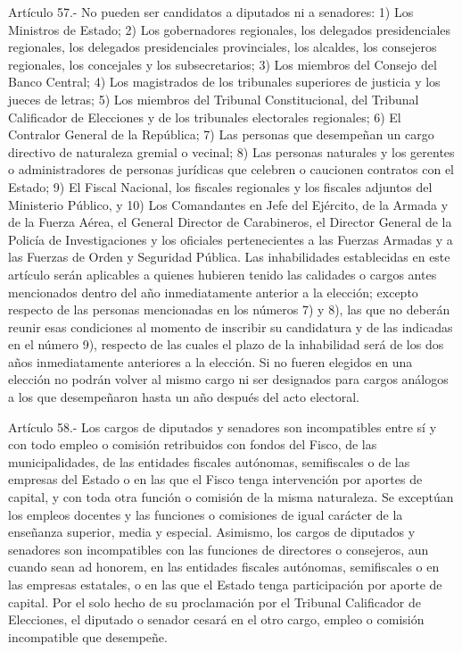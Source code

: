     Artículo 57.- No pueden ser candidatos a diputados ni a senadores:
    1) Los Ministros de Estado;
    2) Los gobernadores regionales, los delegados presidenciales regionales, los delegados presidenciales provinciales, los alcaldes, los consejeros regionales, los concejales y los subsecretarios;
    3) Los miembros del Consejo del Banco Central;
    4) Los magistrados de los tribunales superiores de justicia y los jueces de letras;
    5) Los miembros del Tribunal Constitucional, del Tribunal Calificador de Elecciones y de los tribunales electorales regionales;
    6) El Contralor General de la República;
    7) Las personas que desempeñan un cargo directivo de naturaleza gremial o vecinal;
    8) Las personas naturales y los gerentes o administradores de personas jurídicas que celebren o caucionen contratos con el Estado;
    9) El Fiscal Nacional, los fiscales regionales y los fiscales adjuntos del Ministerio Público, y
    10) Los Comandantes en Jefe del Ejército, de la Armada y de la Fuerza Aérea, el General Director de Carabineros, el Director General de la Policía de Investigaciones y los oficiales pertenecientes a las Fuerzas Armadas y a las Fuerzas de Orden y Seguridad Pública.
    Las inhabilidades establecidas en este artículo serán aplicables a quienes hubieren tenido las calidades o cargos antes mencionados dentro del año inmediatamente anterior a la elección; excepto respecto de las personas mencionadas en los números 7) y 8), las que no deberán reunir esas condiciones al momento de inscribir su candidatura y de las indicadas en el número 9), respecto de las cuales el plazo de la inhabilidad será de los dos años inmediatamente anteriores a la elección. Si no fueren elegidos en una elección no podrán volver al mismo cargo ni ser designados para cargos análogos a los que desempeñaron hasta un año después del acto electoral.



    Artículo 58.- Los cargos de diputados y senadores son incompatibles entre sí y con todo empleo o comisión retribuidos con fondos del Fisco, de las municipalidades, de las entidades fiscales autónomas, semifiscales o de las empresas del Estado o en las que el Fisco tenga intervención por aportes de capital, y con toda otra función o comisión de la misma naturaleza. Se exceptúan los empleos docentes y las funciones o comisiones de igual carácter de la enseñanza superior, media y especial.
    Asimismo, los cargos de diputados y senadores son incompatibles con las funciones de directores o consejeros, aun cuando sean ad honorem, en las entidades fiscales autónomas, semifiscales o en las empresas estatales, o en las que el Estado tenga participación por aporte de capital.
    Por el solo hecho de su proclamación por el Tribunal Calificador de Elecciones, el diputado o senador cesará en el otro cargo, empleo o comisión incompatible que desempeñe.



